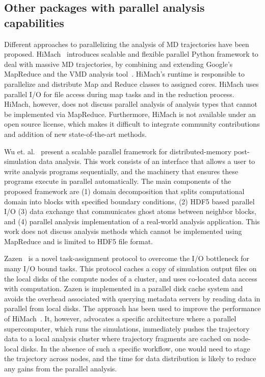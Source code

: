 \subsection{Other packages with parallel analysis capabilities}
\label{sec:otherparallel}

Different approaches to parallelizing the analysis of MD trajectories have been proposed.
HiMach~\cite{himach-2008} introduces scalable and flexible parallel Python framework to deal with massive MD trajectories, by combining and extending Google's MapReduce and the VMD analysis tool~\cite{Hum96}. 
HiMach's runtime is responsible to parallelize and distribute Map and Reduce classes to assigned cores.
HiMach uses parallel I/O for file access during map tasks and  in the reduction process. 
HiMach, however, does not discuss parallel analysis of analysis types that cannot be implemented via MapReduce.
Furthermore, HiMach is not available under an open source license, which makes it difficult to integrate community contributions and addition of new state-of-the-art methods.

Wu et. al.~\cite{Wu_et.al} present a scalable parallel framework for distributed-memory post-simulation data analysis.
This work consists of an interface that allows a user to write analysis programs sequentially, and the machinery that ensures these programs execute in parallel automatically. 
The main components of the proposed framework are (1) domain decomposition that splits computational domain into blocks with specified boundary conditions, (2) HDF5 based parallel I/O (3) data exchange that communicates ghost atoms between neighbor blocks, and (4) parallel analysis implementation of a real-world analysis application.
This work does not discuss analysis methods which cannot be implemented using MapReduce and is limited to HDF5 file format.

Zazen~\cite{Zazen} is a novel task-assignment protocol to overcome the I/O bottleneck for many I/O bound tasks. This protocol caches a copy of simulation output files on the local disks of the compute nodes of a cluster, and uses co-located data access with computation. 
Zazen is implemented in a parallel disk cache system and avoids the overhead associated with querying metadata servers by reading data in parallel from local disks.
The approach has been used to improve the performance of HiMach~\cite{himach-2008}.
It, however, advocates a specific architecture where a parallel supercomputer, which runs the simulations, immediately pushes the trajectory data to a local analysis cluster where trajectory fragments are cached on node-local disks.
In the absence of such a specific  workflow, one would need to stage the trajectory across nodes, and the time for data distribution is likely to reduce any gains from the parallel analysis.

